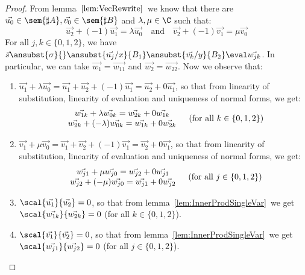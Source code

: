 \begin{proof}
    From lemma~$\ref{lem:VecRewrite}$~we know that there are $\vec{u_0}\in\sem{\sharp A}, \vec{v_0}\in\sem{\sharp B}$ and $\lambda,\mu\in\C$ such that:
    \[
    \vec{u_2} + (-1) \vec{u_1} = \lambda\vec{u_0}\quad\text{and}\quad\vec{v_2} + (-1) \vec{v_1} = \mu \vec{v_0}
    \]
    For all $j,k\in\{0,1,2\}$, we have $\vec{s}\ansubst{\sigma}{}\ansubst{\vec{u_j}/x}{B_1}\ansubst{\vec{v_k}/y}{B_2}\eval\vec{w_{jk}}$. In particular, we can take $\vec{w_1}=\vec{w_{11}}$ and $\vec{w_2}=\vec{w_{22}}$. Now we observe that:
    \begin{enumerate}
        \item\label{A8:it1} $\vec{u_1}+\lambda\vec{u_0}= \vec{u_1} + \vec{u_2} + (-1) \vec{u_1}= \vec{u_2} + 0\vec{u_1}$, so that from linearity of substitution, linearity of evaluation and uniqueness of normal forms, we get:
        \[
        \begin{array}{c c}
            \begin{array}{c}
                \vec{w_{1k}} + \lambda\vec{w_{0k}} = \vec{w_{2k}} + 0 \vec{w_{1k}}\\
                \vec{w_{2k}} + (-\lambda)\vec{w_{0k}} = \vec{w_{1k}} + 0 \vec{w_{2k}}
            \end{array}&
            (\text{for all }k\in\{0,1,2\})
        \end{array}
        \]
        
        \item\label{A8:it2} $\vec{v_1}+\mu\vec{v_0}= \vec{v_1} + \vec{v_2} + (-1) \vec{v_1}= \vec{v_2} + 0\vec{v_1}$, so that from linearity of substitution, linearity of evaluation and uniqueness of normal forms, we get:
        \[
        \begin{array}{c c}
            \begin{array}{c}
                \vec{w_{j1}} + \mu\vec{w_{j0}} = \vec{w_{j2}} + 0 \vec{w_{j1}}\\
                \vec{w_{j2}} + (-\mu)\vec{w_{j0}} = \vec{w_{j1}} + 0 \vec{w_{j2}}
            \end{array}&
            (\text{for all }j\in\{0,1,2\})
        \end{array}
        \]
        
        \item\label{A8:it3} $\scal{\vec{u_1}}{\vec{u_2}}=0$, so that from lemma~\ref{lem:InnerProdSingleVar}~we get $\scal{\vec{w_{1k}}}{\vec{w_{2k}}}=0$ (for all $k\in\{0,1,2\}$).
        
        \item\label{A8:it4} $\scal{\vec{v_1}}{\vec{v_2}}=0$, so that from lemma~\ref{lem:InnerProdSingleVar}~we get $\scal{\vec{w_{j1}}}{\vec{w_{j2}}}=0$ (for all $j\in\{0,1,2\}$).
    \end{enumerate}


\end{proof}
